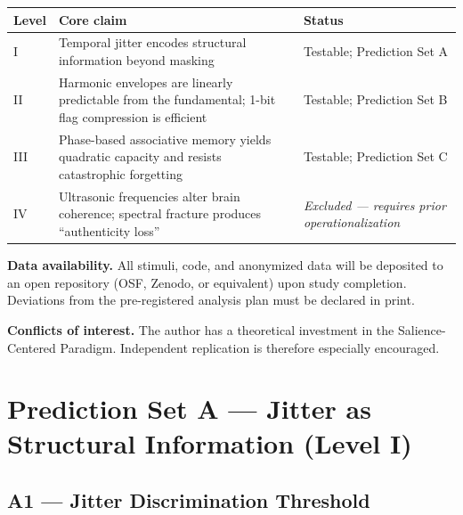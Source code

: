 \documentclass[11pt, a4paper]{article}
\newcommand{\scp}{Salience-Centered Paradigm}
\begin{document}
\noindent\begin{minipage}{\textwidth}
\centering
\renewcommand{\arraystretch}{1.4}
\begin{tabular}{p{1.3cm} p{4.8cm} p{5.5cm}}
\toprule
\textbf{Level} & \textbf{Core claim} & \textbf{Status} \\
\midrule
I   & Temporal jitter encodes structural information beyond masking &
      Testable; Prediction Set A \\
II  & Harmonic envelopes are linearly predictable from the fundamental;
      1-bit flag compression is efficient &
      Testable; Prediction Set B \\
III & Phase-based associative memory yields quadratic capacity and resists
      catastrophic forgetting &
      Testable; Prediction Set C \\
IV  & Ultrasonic frequencies alter brain coherence; spectral fracture produces
      ``authenticity loss'' &
      \emph{Excluded — requires prior operationalization} \\
\bottomrule
\end{tabular}
\end{minipage}

\begin{notebox}
\textbf{Data availability.}  All stimuli, code, and anonymized data will be
deposited to an open repository (OSF, Zenodo, or equivalent) upon study completion.
Deviations from the pre-registered analysis plan must be declared in print.
\end{notebox}

\begin{notebox}
\textbf{Conflicts of interest.}  The author has a theoretical investment in the
\scp{}.  Independent replication is therefore especially encouraged.
\end{notebox}

\section{Prediction Set A — Jitter as Structural Information (Level I)}

\subsection{A1 — Jitter Discrimination Threshold}
\end{document}
